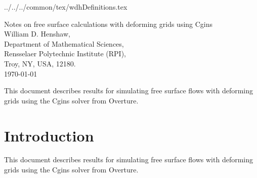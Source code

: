 \documentclass[11pt]{article}
\newcommand{\CgTexDir}{../../../common/tex}%
\begin{document}
 \CgTexDir/wdhDefinitions.tex

\newcommand{\dt}{{\Delta t}}
\newcommand{\rhos}{{\rho_b}}
\newcommand{\rhob}{{\rho_b}}

\newcommand{\Bc}{{\mathcal B}}
\newcommand{\Dc}{{\mathcal D}}
\newcommand{\Ec}{{\mathcal E}}
\newcommand{\Fc}{{\mathcal F}}
\newcommand{\Gc}{{\mathcal G}}
\newcommand{\Hc}{{\mathcal H}}
\newcommand{\Ic}{{\mathcal I}}
\newcommand{\Jc}{{\mathcal J}}
\newcommand{\Lc}{{\mathcal L}}
\newcommand{\Nc}{{\mathcal N}}
\newcommand{\Pc}{{\mathcal P}}
\newcommand{\Rc}{{\mathcal R}}
\newcommand{\Sc}{{\mathcal S}}

\newcommand{\bogus}[1]{}  %

\vspace{5\baselineskip}
\begin{flushleft}
{\LARGE
Notes on free surface calculations with deforming grids using Cgins\\
}
\vspace{2\baselineskip}
William D. Henshaw, \\
% 
\smallskip
% 
Department of Mathematical Sciences, \\
Rensselaer Polytechnic Institute (RPI), \\
Troy, NY, USA, 12180. \\
\vspace{\baselineskip}
\today\\

\vspace{4\baselineskip}


This document describes results for simulating free surface flows with deforming grids using the Cgins solver
from Overture. 

\end{flushleft}

\tableofcontents

\clearpage
\section{Introduction}

This document describes results for simulating free surface flows with deforming grids using the Cgins solver
from Overture. 




% 
% 
\end{document}
